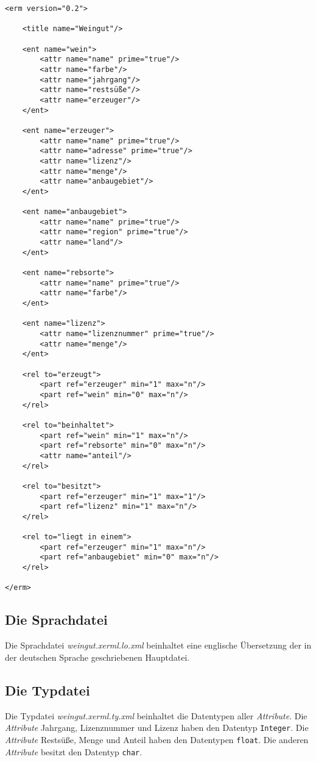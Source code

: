 \begin{verbatim}
<erm version="0.2">

    <title name="Weingut"/>

    <ent name="wein">
        <attr name="name" prime="true"/>
        <attr name="farbe"/>
        <attr name="jahrgang"/>
        <attr name="restsüße"/>
        <attr name="erzeuger"/>
    </ent>

    <ent name="erzeuger">
        <attr name="name" prime="true"/>
        <attr name="adresse" prime="true"/>
        <attr name="lizenz"/>
        <attr name="menge"/>
        <attr name="anbaugebiet"/>
    </ent>

    <ent name="anbaugebiet">
        <attr name="name" prime="true"/>
        <attr name="region" prime="true"/>
        <attr name="land"/>
    </ent>

    <ent name="rebsorte">
        <attr name="name" prime="true"/>
        <attr name="farbe"/>
    </ent>

    <ent name="lizenz">
        <attr name="lizenznummer" prime="true"/>
        <attr name="menge"/>
    </ent>

    <rel to="erzeugt">
        <part ref="erzeuger" min="1" max="n"/>
        <part ref="wein" min="0" max="n"/>
    </rel>

    <rel to="beinhaltet">
        <part ref="wein" min="1" max="n"/>
        <part ref="rebsorte" min="0" max="n"/>
        <attr name="anteil"/>
    </rel>

    <rel to="besitzt">
        <part ref="erzeuger" min="1" max="1"/>
        <part ref="lizenz" min="1" max="n"/>
    </rel>

    <rel to="liegt in einem">
        <part ref="erzeuger" min="1" max="n"/>
        <part ref="anbaugebiet" min="0" max="n"/>
    </rel>

</erm>
\end{verbatim}



\subsection{Die Sprachdatei}
\hon{}

\noindent
Die Sprachdatei \textit{weingut.xerml.lo.xml} beinhaltet eine englische Übersetzung der in der deutschen Sprache geschriebenen Hauptdatei.

\subsection{Die Typdatei}
\hon{}

\noindent
Die Typdatei \textit{weingut.xerml.ty.xml} beinhaltet die Datentypen aller \textit{Attribute}. Die \textit{Attribute} Jahrgang, Lizenznummer und Lizenz haben den Datentyp \verb|Integer|. Die \textit{Attribute} Restsüße, Menge und Anteil haben den Datentypen \verb|float|. Die anderen \textit{Attribute} besitzt den Datentyp \verb|char|.


